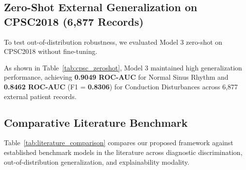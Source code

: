 \documentclass[12pt]{elsarticle}
\begin{document}
\subsection{Zero-Shot External Generalization on CPSC2018 (6,877 Records)}
To test out-of-distribution robustness, we evaluated Model 3 zero-shot on CPSC2018 without fine-tuning.

\begin{table}[t]
\caption{Zero-Shot Benchmark Results on CPSC2018 Dataset (6,877 Records).}
\label{tab:cpsc_zeroshot}
\centering
\small
\setlength{\tabcolsep}{3.5pt}
\end{table}

As shown in Table~\ref{tab:cpsc_zeroshot}, Model 3 maintained high generalization performance, achieving \textbf{0.9049 ROC-AUC} for Normal Sinus Rhythm and \textbf{0.8462 ROC-AUC} (F1 = \textbf{0.8306}) for Conduction Disturbances across 6,877 external patient records.

\subsection{Comparative Literature Benchmark}
Table~\ref{tab:literature_comparison} compares our proposed framework against established benchmark models in the literature across diagnostic discrimination, out-of-distribution generalization, and explainability modality.
\end{document}
